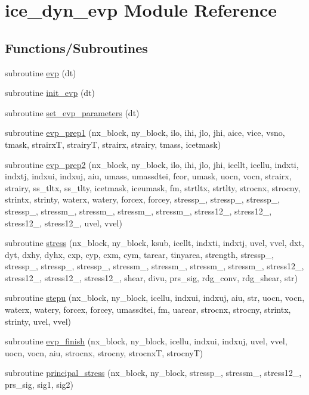 \hypertarget{namespaceice__dyn__evp}{
\section{ice\_\-dyn\_\-evp Module Reference}
\label{namespaceice__dyn__evp}
}
\subsection*{Functions/Subroutines}
\begin{DoxyCompactItemize}
\item 
subroutine \hyperlink{namespaceice__dyn__evp_a918e64924a8bc6d83610141982c8f5dd}{evp} (dt)
\item 
subroutine \hyperlink{namespaceice__dyn__evp_a58b637b31c877db0c8ac033d2249f49a}{init\_\-evp} (dt)
\item 
subroutine \hyperlink{namespaceice__dyn__evp_ae005a696d21f367a95138aca2aa5bb07}{set\_\-evp\_\-parameters} (dt)
\item 
subroutine \hyperlink{namespaceice__dyn__evp_acc726e42608cf46cb1990178a3ec0bf0}{evp\_\-prep1} (nx\_\-block, ny\_\-block, ilo, ihi, jlo, jhi, aice, vice, vsno, tmask, strairxT, strairyT, strairx, strairy, tmass, icetmask)
\item 
subroutine \hyperlink{namespaceice__dyn__evp_a8b2b9cdda98c21801a3180641ba3f000}{evp\_\-prep2} (nx\_\-block, ny\_\-block, ilo, ihi, jlo, jhi, icellt, icellu, indxti, indxtj, indxui, indxuj, aiu, umass, umassdtei, fcor, umask, uocn, vocn, strairx, strairy, ss\_\-tltx, ss\_\-tlty, icetmask, iceumask, fm, strtltx, strtlty, strocnx, strocny, strintx, strinty, waterx, watery, forcex, forcey, stressp\_, stressp\_, stressp\_, stressp\_, stressm\_, stressm\_, stressm\_, stressm\_, stress12\_, stress12\_, stress12\_, stress12\_, uvel, vvel)
\item 
subroutine \hyperlink{namespaceice__dyn__evp_a14a0351cda0756eaf7905bdec6b9e326}{stress} (nx\_\-block, ny\_\-block, ksub, icellt, indxti, indxtj, uvel, vvel, dxt, dyt, dxhy, dyhx, cxp, cyp, cxm, cym, tarear, tinyarea, strength, stressp\_, stressp\_, stressp\_, stressp\_, stressm\_, stressm\_, stressm\_, stressm\_, stress12\_, stress12\_, stress12\_, stress12\_, shear, divu, prs\_\-sig, rdg\_\-conv, rdg\_\-shear, str)
\item 
subroutine \hyperlink{namespaceice__dyn__evp_ac9b44f5692202d76ab19930c44aa8766}{stepu} (nx\_\-block, ny\_\-block, icellu, indxui, indxuj, aiu, str, uocn, vocn, waterx, watery, forcex, forcey, umassdtei, fm, uarear, strocnx, strocny, strintx, strinty, uvel, vvel)
\item 
subroutine \hyperlink{namespaceice__dyn__evp_a98d3c4b7bf9a4ca30d3c1d133792920e}{evp\_\-finish} (nx\_\-block, ny\_\-block, icellu, indxui, indxuj, uvel, vvel, uocn, vocn, aiu, strocnx, strocny, strocnxT, strocnyT)
\item 
subroutine \hyperlink{namespaceice__dyn__evp_ad8621c859aae602cd6702347e2db568b}{principal\_\-stress} (nx\_\-block, ny\_\-block, stressp\_, stressm\_, stress12\_, prs\_\-sig, sig1, sig2)
\end{DoxyCompactItemize}
